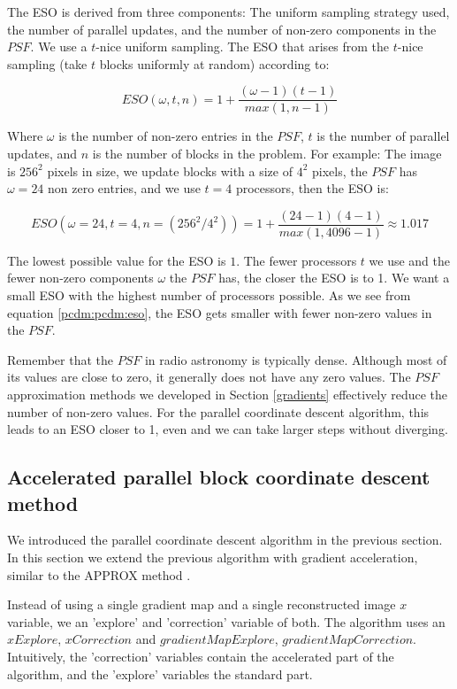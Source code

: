 The ESO is derived from three components: The uniform sampling strategy used, the number of parallel updates, and the number of non-zero components in the $PSF$. We use a $t$-nice uniform sampling. The ESO that arises from the $t$-nice sampling (take $t$ blocks uniformly at random) according to\cite{richtarik2016parallel}:

\begin{equation}\label{pcdm:pcdm:eso}
ESO(\omega, t, n) = 1+ \frac{(\omega - 1)(t - 1)}{max(1, n -1)}
\end{equation}

Where $\omega$ is the number of non-zero entries in the $PSF$, $t$ is the number of parallel updates, and $n$ is the number of blocks in the problem. For example: The image is $256^2$ pixels in size, we update blocks with a size of $4^2$ pixels, the $PSF$ has $\omega = 24$ non zero entries, and we use $t = 4$ processors, then the ESO is:

\begin{equation}
ESO(\omega = 24, t = 4, n = (256^2 / 4^2)) = 1+ \frac{(24 - 1)(4 - 1)}{max(1, 4096 -1)} \approx 1.017
\end{equation}

The lowest possible value for the ESO is $1$. The fewer processors $t$ we use and the fewer non-zero components $\omega$ the $PSF$ has, the closer the ESO is to 1. We want a small ESO with the highest number of processors possible. As we see from equation \eqref{pcdm:pcdm:eso}, the ESO gets smaller with fewer non-zero values in the $PSF$.

Remember that the $PSF$ in radio astronomy is typically dense. Although most of its values are close to zero, it generally does not have any zero values. The $PSF$ approximation methods we developed in Section \ref{gradients} effectively reduce the number of non-zero values. For the parallel coordinate descent algorithm, this leads to an ESO closer to 1, even  and we can take larger steps without diverging.


\subsection{Accelerated parallel block coordinate descent method}
We introduced the parallel coordinate descent algorithm in the previous section. In this section we extend the previous algorithm with gradient acceleration, similar to the APPROX method \cite{fercoq2015accelerated}.

Instead of using a single gradient map and a single reconstructed image $x$ variable, we an 'explore' and 'correction' variable of both. The algorithm uses an $xExplore$,  $xCorrection$ and $gradientMapExplore$, $gradientMapCorrection$. Intuitively, the 'correction' variables contain the accelerated part of the algorithm, and the 'explore' variables the standard part.

